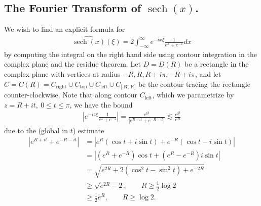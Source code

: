 \documentclass[12pt,reqno]{amsart}
\numberwithin{equation}{section}  %
\newcommand{\wh}{\widehat}
\DeclareMathOperator{\sech}{sech}
\begin{document}
\subsection{The Fourier Transform of $\sech(x)$.} 
\label{ssec:four-sech}
        We wish to find an explicit
        formula for
        \begin{equation}
          \label{sech-four-init}
        \begin{split}
          \wh{\sech(x)}(\xi) = 2 \int_{- \infty}^{ \infty} e^{-i x \xi}
          \frac{1}{e^{x} + e^{-x}} dx 
        \end{split}
        \end{equation}
        by computing the integral on the right hand side using contour
        integration in the complex plane and the residue theorem.
        Let $D = D(R)$ be a rectangle in the complex plane with vertices at radius
        $ -R, R, R + i \pi, -R + i \pi$, and let $C = C(R) = C_{\text{right}}
        \cup C_{\text{top}}\cup C_{\text{left}} \cup C_{\text{[-R, R]}}$
        be the contour tracing the rectangle counter-clockwise. Note that along
        contour $C_{\text{left}}$, which we parametrize by $z = R + it, \ 0 \le
        t \le \pi$, we have the
        bound
        \begin{equation*}
        \begin{split}
          | e^{-iz \xi} \frac{1}{e^{z} + e^{-z}} | = \frac{e^{\xi t}}{| e^{R + it} +
          e^{-R -it}|} \lesssim \frac{e^{\xi t}}{e^{R}}
        \end{split}
        \end{equation*}
        due to the (global in $t$) estimate
        \begin{equation}
          \label{key-abs-est}
        \begin{split}
          | e^{R + it} + e^{-R -it} |
          & = | e^{R}(\cos t + i \sin t) + e^{-R}(\cos t - i \sin t) |
          \\
          & = | (e^{R} + e^{-R})\cos t + (e^{R} - e^{-R})i \sin t |
          \\
          & = \sqrt{e^{2R} + 2(\cos^{2} t - \sin^{2} t ) + e^{-2R}}
          \\
          & \ge \sqrt{e^{2R} -2}, \qquad R \ge \frac{1}{2}\log 2
          \\
          & \ge \frac{1}{2}e^{R}, \qquad R \ge \log 2.
        \end{split}
        \end{equation}
\end{document}
